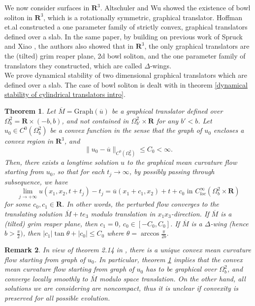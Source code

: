 \documentclass[pdflatex,sn-mathphys-num]{sn-jnl}%
\newtheorem{theorem}{Theorem}[section]
\newtheorem{remark}[theorem]{Remark}
\begin{document}
We now consider surfaces in $\mathbf{R}^3$. Altschuler and Wu \cite{altschuler1994translating} showed the existence of bowl soliton in $\mathbf{R}^3$, which is a rotationally symmetric, graphical translator. Hoffman et.al \cite{Hoffman2018GraphicalTF} constructed a one parameter family of strictly convex, graphical translators defined over a slab. In the same paper, by building on previous work of Spruck and Xiao \cite{spruck2020complete}, the authors also showed that in $\mathbf{R}^3$, the only graphical translators are the (tilted) grim reaper plane, 2d bowl soliton, and the one parameter family of translators they constructed, which are called $\Delta$-wings.\\ 

We prove dynamical stability of two dimensional graphical translators which are defined over a slab. The case of bowl soliton is dealt with in theorem \ref{dynamical stability of cylindrical translators intro}.  
\begin{theorem}\label{dynamical stability for 2d translators intro}
    Let $\overline{M} = \text{Graph}(\overline{u})$ be a graphical translator defined over $\Omega^2_b = \mathbf{R}\times (-b, b)$, and not contained in $\Omega^2_{b'}\times \mathbf{R}$ for any $b' < b$. Let $u_0 \in C^0(\Omega^2_b)$ be a convex function in the sense that the graph of $u_0$ encloses a convex region in $\mathbf{R}^3$, and
\begin{equation}
   \|u_0 - \overline{u}\|_{C^0(\Omega_b^2)}\leq C_0 < \infty.
\end{equation}
Then, there exists a longtime solution $u$ to the graphical mean curvature flow starting from $u_0$, so that for each $t_j \to \infty$, by possibly passing through subsequence, we have
$$\lim_{j \to + \infty}u(x_1,x_2,t + {t}_j) -t_j  = \overline{u}(x_1 + c_1, x_2) + t+c_0 \text{ in }C^{\infty}_{loc}(\Omega^2_b \times \mathbf{R})$$
for some $c_0, c_1 \in \mathbf{R}$. In other words, the perturbed flow converges to the translating solution $\overline{M} + te_3$ modulo translation in $x_1x_3$-direction. If $\overline{M}$ is a (tilted) grim reaper plane, then $c_1 = 0$, $c_0 \in [-C_0, C_0]$. If $\overline{M}$ is a $\Delta$-wing (hence $b > \frac{\pi}{2})$, then $|c_1|\tan\theta + |c_0| \leq C_0$ where $\theta = \arccos\frac{\pi}{2b}$. 
\end{theorem}
\begin{remark}
    In view of theorem 2.14 in \cite{dynamicsconvex}, there is a unique convex mean curvature flow starting from graph of $u_0$. In particular, theorem \ref{dynamical stability for 2d translators intro} implies that the convex mean curvature flow starting from graph of $u_0$ has to be graphical over $\Omega^2_b$, and converge locally smoothly to $\overline{M}$ modulo space translation. On the other hand, all solutions we are considering are noncompact, thus it is unclear if convexity is preserved for all possible evolution. 
\end{remark}
\end{document}
